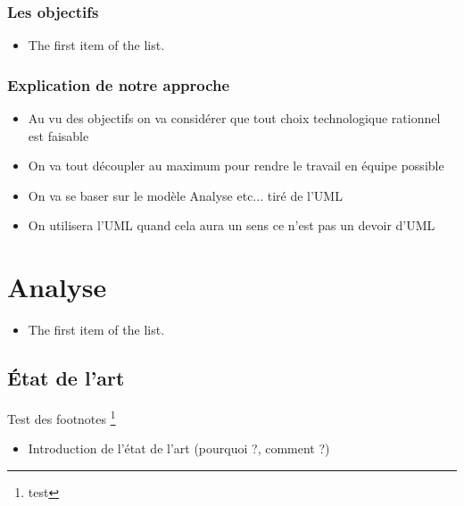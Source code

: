 \documentclass{rapport_stage}
\begin{document}
\section{Les objectifs}

\begin{itemize}[label=$\bullet$]
  \item The first item of the list.
\end{itemize}

\section{Explication de notre approche}

\begin{itemize}[label=$\bullet$]
  \item Au vu des objectifs on va considérer que tout choix technologique rationnel est faisable
  \item On va tout découpler au maximum pour rendre le travail en équipe possible
  \item On va se baser sur le modèle Analyse etc... tiré de l'UML
  \item On utilisera l'UML quand cela aura un sens ce n'est pas un devoir d'UML
\end{itemize}




\part{Analyse}

\begin{itemize}[label=$\bullet$]
  \item The first item of the list.
\end{itemize}



\chapter{État de l'art}


Test des footnotes \footnote{test}
\begin{itemize}[label=$\bullet$]
  \item Introduction de l'état de l'art (pourquoi ?, comment ?)
\end{itemize}
\end{document}

